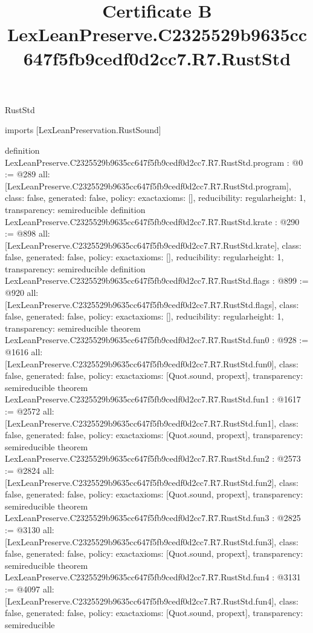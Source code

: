 \begin{lexlean}{RustStd}
\title{Certificate B LexLeanPreserve.C2325529b9635cc647f5fb9cedf0d2cc7.R7.RustStd}
\begin{coremodule}
imports [LexLeanPreservation.RustSound]

definition LexLeanPreserve.C2325529b9635cc647f5fb9cedf0d2cc7.R7.RustStd.program : @0 := @289 {
  all: [LexLeanPreserve.C2325529b9635cc647f5fb9cedf0d2cc7.R7.RustStd.program],
  class: false,
  generated: false,
  policy: exact{axioms: []},
  reducibility: regular{height: 1},
  transparency: semireducible
}
definition LexLeanPreserve.C2325529b9635cc647f5fb9cedf0d2cc7.R7.RustStd.krate : @290 := @898 {
  all: [LexLeanPreserve.C2325529b9635cc647f5fb9cedf0d2cc7.R7.RustStd.krate],
  class: false,
  generated: false,
  policy: exact{axioms: []},
  reducibility: regular{height: 1},
  transparency: semireducible
}
definition LexLeanPreserve.C2325529b9635cc647f5fb9cedf0d2cc7.R7.RustStd.flags : @899 := @920 {
  all: [LexLeanPreserve.C2325529b9635cc647f5fb9cedf0d2cc7.R7.RustStd.flags],
  class: false,
  generated: false,
  policy: exact{axioms: []},
  reducibility: regular{height: 1},
  transparency: semireducible
}
theorem LexLeanPreserve.C2325529b9635cc647f5fb9cedf0d2cc7.R7.RustStd.fun0 : @928 := @1616 {
  all: [LexLeanPreserve.C2325529b9635cc647f5fb9cedf0d2cc7.R7.RustStd.fun0],
  class: false,
  generated: false,
  policy: exact{axioms: [Quot.sound, propext]},
  transparency: semireducible
}
theorem LexLeanPreserve.C2325529b9635cc647f5fb9cedf0d2cc7.R7.RustStd.fun1 : @1617 := @2572 {
  all: [LexLeanPreserve.C2325529b9635cc647f5fb9cedf0d2cc7.R7.RustStd.fun1],
  class: false,
  generated: false,
  policy: exact{axioms: [Quot.sound, propext]},
  transparency: semireducible
}
theorem LexLeanPreserve.C2325529b9635cc647f5fb9cedf0d2cc7.R7.RustStd.fun2 : @2573 := @2824 {
  all: [LexLeanPreserve.C2325529b9635cc647f5fb9cedf0d2cc7.R7.RustStd.fun2],
  class: false,
  generated: false,
  policy: exact{axioms: [Quot.sound, propext]},
  transparency: semireducible
}
theorem LexLeanPreserve.C2325529b9635cc647f5fb9cedf0d2cc7.R7.RustStd.fun3 : @2825 := @3130 {
  all: [LexLeanPreserve.C2325529b9635cc647f5fb9cedf0d2cc7.R7.RustStd.fun3],
  class: false,
  generated: false,
  policy: exact{axioms: [Quot.sound, propext]},
  transparency: semireducible
}
theorem LexLeanPreserve.C2325529b9635cc647f5fb9cedf0d2cc7.R7.RustStd.fun4 : @3131 := @4097 {
  all: [LexLeanPreserve.C2325529b9635cc647f5fb9cedf0d2cc7.R7.RustStd.fun4],
  class: false,
  generated: false,
  policy: exact{axioms: [Quot.sound, propext]},
  transparency: semireducible
}
\end{coremodule}
\end{lexlean}
